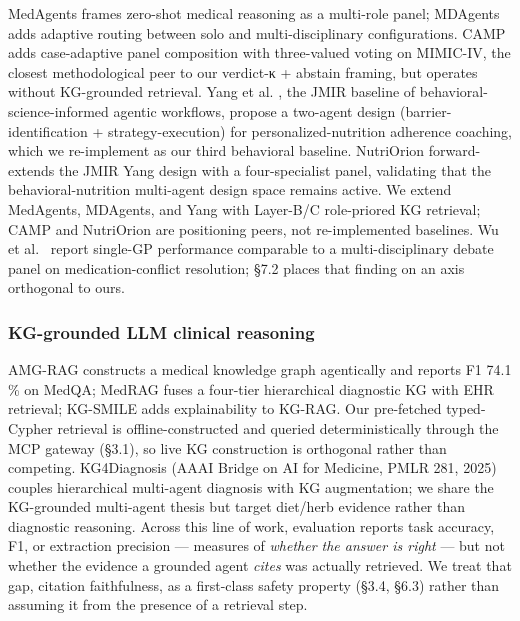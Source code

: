 \documentclass[
]{article}
\begin{document}
MedAgents \citep{medagents2024} frames zero-shot medical reasoning as a
multi-role panel; MDAgents \citep{mdagents2024} adds adaptive routing
between solo and multi-disciplinary configurations. CAMP
\citep{camp2026} adds case-adaptive panel composition with three-valued
voting on MIMIC-IV, the closest methodological peer to our verdict-κ +
abstain framing, but operates without KG-grounded retrieval. Yang et al.
\citep{yang2025}, the JMIR baseline of behavioral-science-informed
agentic workflows, propose a two-agent design (barrier-identification +
strategy-execution) for personalized-nutrition adherence coaching, which
we re-implement as our third behavioral baseline. NutriOrion
\citep{nutriorion2026} forward-extends the JMIR Yang design with a
four-specialist panel, validating that the behavioral-nutrition
multi-agent design space remains active. We extend MedAgents, MDAgents,
and Yang with Layer-B/C role-priored KG retrieval; CAMP and NutriOrion
are positioning peers, not re-implemented baselines. Wu et
al.~\citep{wu2025} report single-GP performance comparable to a
multi-disciplinary debate panel on medication-conflict resolution; §7.2
places that finding on an axis orthogonal to ours.

\hypertarget{kg-grounded-llm-clinical-reasoning}{%
\subsubsection{KG-grounded LLM clinical
reasoning}\label{kg-grounded-llm-clinical-reasoning}}

AMG-RAG \citep{amgrag2025} constructs a medical knowledge graph
agentically and reports F1 74.1 \% on MedQA; MedRAG \citep{medrag2025}
fuses a four-tier hierarchical diagnostic KG with EHR retrieval;
KG-SMILE \citep{kgsmile2025} adds explainability to KG-RAG. Our
pre-fetched typed-Cypher retrieval is offline-constructed and queried
deterministically through the MCP gateway (§3.1), so live KG
construction is orthogonal rather than competing. KG4Diagnosis
\citep{kg4diagnosis2025} (AAAI Bridge on AI for Medicine, PMLR 281,
2025) couples hierarchical multi-agent diagnosis with KG augmentation;
we share the KG-grounded multi-agent thesis but target diet/herb
evidence rather than diagnostic reasoning. Across this line of work,
evaluation reports task accuracy, F1, or extraction precision ---
measures of \emph{whether the answer is right} --- but not whether the
evidence a grounded agent \emph{cites} was actually retrieved. We treat
that gap, citation faithfulness, as a first-class safety property (§3.4,
§6.3) rather than assuming it from the presence of a retrieval step.
\end{document}
